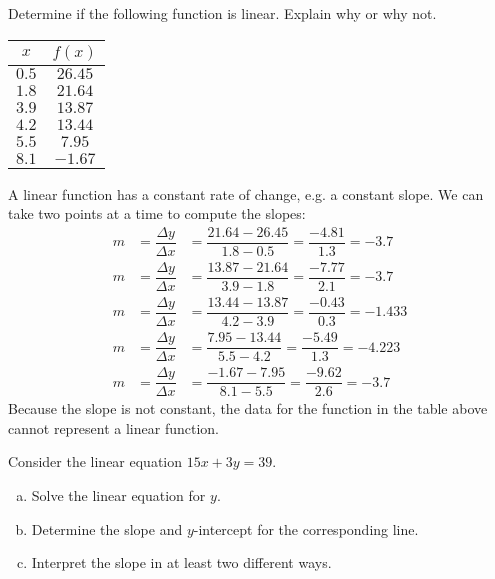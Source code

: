 \documentclass[11pt,letterpaper]{article}
\begin{document}
\newpage



 Determine if the following function is linear. Explain why or why not.
	\begin{table}[!ht]
	\centering
	\begin{tabular}{c|c}
	$x$ & $f(x)$ \\ \hline
	$0.5$ & $26.45$ \\
	$1.8$ & $21.64$ \\
	$3.9$ & $13.87$ \\
	$4.2$ & $13.44$ \\
	$5.5$ & $7.95$ \\
	$8.1$ & $-1.67$
	\end{tabular}
	\end{table} \pspace

\sol A linear function has a constant rate of change, e.g. a constant slope. We can take two points at a time to compute the slopes: \pspace
	\[
	\begin{aligned}
	m&= \dfrac{\Delta y}{\Delta x}&= \dfrac{21.64 - 26.45}{1.8 - 0.5}= \dfrac{-4.81}{1.3}= -3.7 \\[0.3cm]
	m&= \dfrac{\Delta y}{\Delta x}&= \dfrac{13.87 - 21.64}{3.9 - 1.8}= \dfrac{-7.77}{2.1}= -3.7 \\[0.3cm]
	m&= \dfrac{\Delta y}{\Delta x}&= \dfrac{13.44 - 13.87}{4.2 - 3.9}= \dfrac{-0.43}{0.3}= -1.433 \\[0.3cm]
	m&= \dfrac{\Delta y}{\Delta x}&= \dfrac{7.95 - 13.44}{5.5 - 4.2}= \dfrac{-5.49}{1.3}= -4.223 \\[0.3cm]
	m&= \dfrac{\Delta y}{\Delta x}&= \dfrac{-1.67 - 7.95}{8.1 - 5.5}= \dfrac{-9.62}{2.6}= -3.7
	\end{aligned}
	\] \pspace
Because the slope is not constant, the data for the function in the table above cannot represent a linear function. 



\newpage



 Consider the linear equation $15x + 3y= 39$. 
        \begin{enumerate}[(a)]
        \item Solve the linear equation for $y$. 
        \item Determine the slope and $y$-intercept for the corresponding line.
        \item Interpret the slope in at least two different ways. 
        \end{enumerate} \pspace
\end{document}
